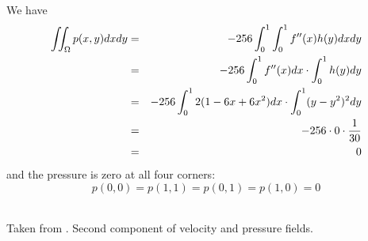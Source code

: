 We have 
\begin{eqnarray}
\iint_\Omega p(x,y) dxdy 
&=& -256 \int_{0}^{1}\int_{0}^{1} f''(x) h(y) dxdy \nonumber\\
&=& -256 \int_{0}^{1} f''(x) dx \cdot \int_{0}^{1}  h(y) dy \nonumber\\
&=& -256 \int_{0}^{1} 2(1-6x+6x^2) dx \cdot \int_{0}^{1}  (y-y^2)^2 dy \nonumber\\
&=& -256 \cdot 0 \cdot \frac{1}{30}  \nonumber\\ 
&=& 0
\end{eqnarray}
and the pressure is zero at all four corners:
\[
p(0,0)=p(1,1)=p(0,1)=p(1,0)=0
\]


\begin{center}
\\
{\captionfont Taken from \cite{zhan09}. Second component of velocity and pressure fields.}
\end{center}

